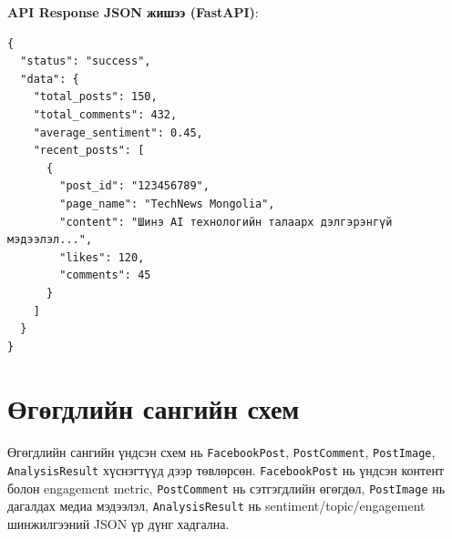 \textbf{API Response JSON жишээ (FastAPI)}:
\begin{verbatim}
{
  "status": "success",
  "data": {
    "total_posts": 150,
    "total_comments": 432,
    "average_sentiment": 0.45,
    "recent_posts": [
      {
        "post_id": "123456789",
        "page_name": "TechNews Mongolia",
        "content": "Шинэ AI технологийн талаарх дэлгэрэнгүй мэдээлэл...",
        "likes": 120,
        "comments": 45
      }
    ]
  }
}
\end{verbatim}

\section{Өгөгдлийн сангийн схем}

Өгөгдлийн сангийн үндсэн схем нь \texttt{FacebookPost}, \texttt{PostComment}, \texttt{PostImage}, \texttt{AnalysisResult} хүснэгтүүд дээр төвлөрсөн. \texttt{FacebookPost} нь үндсэн контент болон engagement metric, \texttt{PostComment} нь сэтгэгдлийн өгөгдөл, \texttt{PostImage} нь дагалдах медиа мэдээлэл, \texttt{AnalysisResult} нь sentiment/topic/engagement шинжилгээний JSON үр дүнг хадгална.
